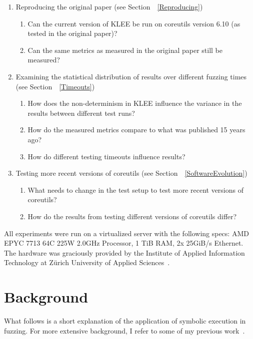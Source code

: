 \documentclass{article}
\let\savedCite=\cite
\renewcommand{\cite}{\unskip~\savedCite}
\let\savedRef=\ref
\renewcommand{\ref}{\unskip~\savedRef}
\begin{document}
\begin{enumerate}
    \item Reproducing the original paper (see Section~\ref{Reproducing})
          \begin{enumerate}
              \item Can the current version of KLEE be run on coreutils version 6.10 (as tested in the original paper)?
              \item Can the same metrics as measured in the original paper still be measured?
          \end{enumerate}
    \item Examining the statistical distribution of results over different fuzzing times (see Section~\ref{Timeouts})
          \begin{enumerate}
              \item How does the non-determinism in KLEE influence the variance in the results between different test runs?
              \item How do the measured metrics compare to what was published 15 years ago?
              \item How do different testing timeouts influence results?
          \end{enumerate}
    \item Testing more recent versions of coreutils (see Section~\ref{SoftwareEvolution})
          \begin{enumerate}
              \item What needs to change in the test setup to test more recent versions of coreutils?
              \item How do the results from testing different versions of coreutils differ?
          \end{enumerate}
\end{enumerate}

All experiments were run on a virtualized server with the following specs: AMD EPYC 7713 64C 225W 2.0GHz Processor, 1 TiB RAM, 2x 25GiB/s Ethernet. The hardware was graciously provided by the Institute of Applied Information Technology at Zürich University of Applied Sciences\cite{InIT}.

\section{Background}

What follows is a short explanation of the application of symbolic execution in fuzzing. For more extensive background, I refer to some of my previous work\cite{EVA, BA}.
\end{document}
